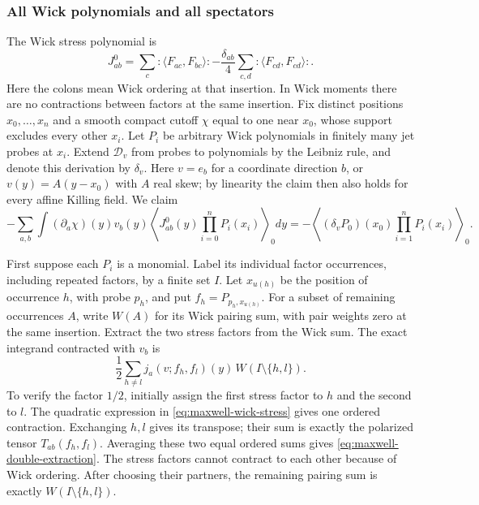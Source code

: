\subsubsection{All Wick polynomials and all spectators}
The Wick stress polynomial is
\begin{equation}\label{eq:maxwell-wick-stress}
 J^0_{ab}=\sum_c:\!\langle F_{ac},F_{bc}\rangle\!:
       -\frac{\delta_{ab}}4\sum_{c,d}:\!\langle F_{cd},F_{cd}\rangle\!:.
\end{equation}
Here the colons mean Wick ordering at that insertion. In Wick moments
there are no contractions between factors at the same insertion.
Fix distinct positions $x_0,\ldots,x_n$ and a smooth compact cutoff
$\chi$ equal to one near $x_0$, whose support excludes every other
$x_i$. Let $P_i$ be arbitrary Wick polynomials in finitely many jet
probes at $x_i$. Extend $\mathscr D_v$ from probes to polynomials
by the Leibniz rule, and denote this derivation by $\delta_v$. Here
$v=e_b$ for a coordinate direction $b$, or $v(y)=A(y-x_0)$ with $A$ real
skew; by linearity the claim then also holds for every affine Killing
field. We claim
\begin{equation}\label{eq:maxwell-polynomial-ward}
 -\sum_{a,b}\int(\partial_a\chi)(y)v_b(y)
   \left\langle J^0_{ab}(y)\prod_{i=0}^nP_i(x_i)\right\rangle_0dy
       =-\left\langle(\delta_vP_0)(x_0)
                            \prod_{i=1}^nP_i(x_i)\right\rangle_0.
\end{equation}

First suppose each $P_i$ is a monomial. Label its individual factor
occurrences, including repeated factors, by a finite set $I$. Let
$x_{u(h)}$ be the position of occurrence $h$, with probe $p_h$,
and put $f_h=P_{p_h,x_{u(h)}}$. For a subset of remaining occurrences
$A$, write $W(A)$ for its Wick pairing sum, with pair weights zero
at the same insertion. Extract the two stress factors from the Wick
sum. The exact integrand contracted with $v_b$ is
\begin{equation}\label{eq:maxwell-double-extraction}
 \frac12\sum_{h\ne l}j_a(v;f_h,f_l)(y)\,
                                      W(I\setminus\{h,l\}).
\end{equation}
To verify the factor $1/2$, initially assign the first stress factor
to $h$ and the second to $l$. The quadratic expression in
\eqref{eq:maxwell-wick-stress} gives one ordered contraction.
Exchanging $h,l$ gives its transpose; their sum is exactly the
polarized tensor $T_{ab}(f_h,f_l)$. Averaging these two equal
ordered sums gives \eqref{eq:maxwell-double-extraction}.
The stress factors cannot contract to each other because of Wick
ordering. After choosing their partners, the remaining pairing sum
is exactly $W(I\setminus\{h,l\})$.

